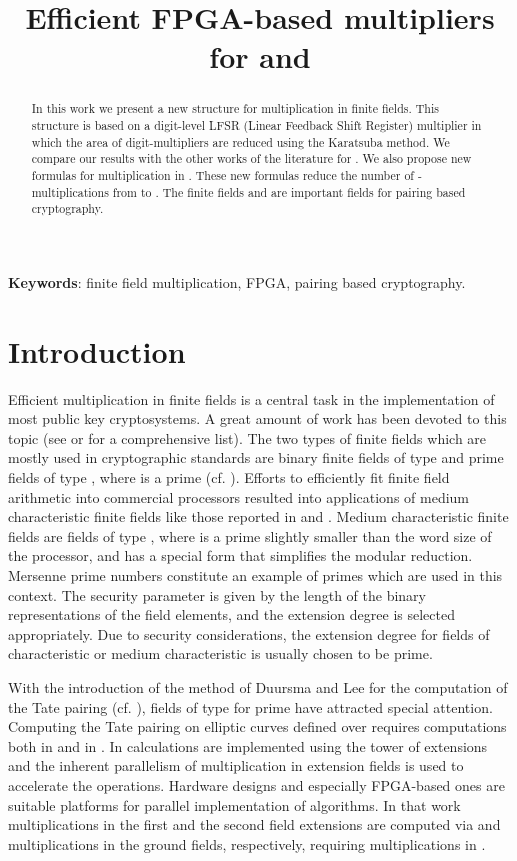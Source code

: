\documentclass{article}
\title{Efficient FPGA-based multipliers for  and }
\begin{document}
\maketitle




\begin{abstract}
In this work we present a new structure for multiplication in finite fields. 
This structure is based on a digit-level LFSR (Linear Feedback Shift
Register) multiplier in which the area of digit-multipliers are
reduced using the Karatsuba method. We compare our results with the
other works of the literature for . We also propose new
formulas for multiplication in . These new
formulas reduce the number of -multiplications from 
to . The finite fields  and  are
important fields for pairing based cryptography. 
\end{abstract}


{\bf Keywords}: finite field multiplication, FPGA, pairing based
cryptography.

\section{Introduction}
\label{sec:intro}

Efficient multiplication in finite fields is a central task in the
implementation of most public key cryptosystems. A great amount of
work has been devoted to this topic (see \cite{knu98} or
\cite{gatger03} for a comprehensive list).
The two types of finite fields which are mostly used in cryptographic
standards are binary finite fields of type  and prime
fields of type , where  is a prime (cf. \cite{dss00}).
Efforts to efficiently fit finite field arithmetic into commercial
processors resulted into applications of medium characteristic finite
fields like those reported in \cite{baipaa98} and \cite{avamih03}.
Medium characteristic finite fields are fields of type ,
where  is a prime slightly smaller than the word size of the
processor, and has a special form that simplifies the modular
reduction. Mersenne prime numbers constitute an example of primes
which are used in this context. 
The security parameter is given by the length of the binary
representations of the field elements, and the extension degree  is
selected appropriately.
Due to security considerations, the extension degree for fields of
characteristic  or medium characteristic is usually chosen to be
prime.

With the introduction of the method of Duursma and Lee for the
computation of the Tate pairing (cf. \cite{duulee03}), fields of type
 for  prime have attracted special attention.
Computing the Tate pairing on elliptic curves defined over
 requires computations both in  and in
.
In \cite{kermar05} calculations are implemented using the tower of
extensions  and the
inherent parallelism of multiplication in extension fields is used to
accelerate the operations. 
Hardware designs and especially FPGA-based ones are suitable platforms
for parallel implementation of algorithms.
In that work multiplications in the first and the second field
extensions are computed via  and  multiplications in the ground
fields, respectively, requiring  multiplications in .
\end{document}
